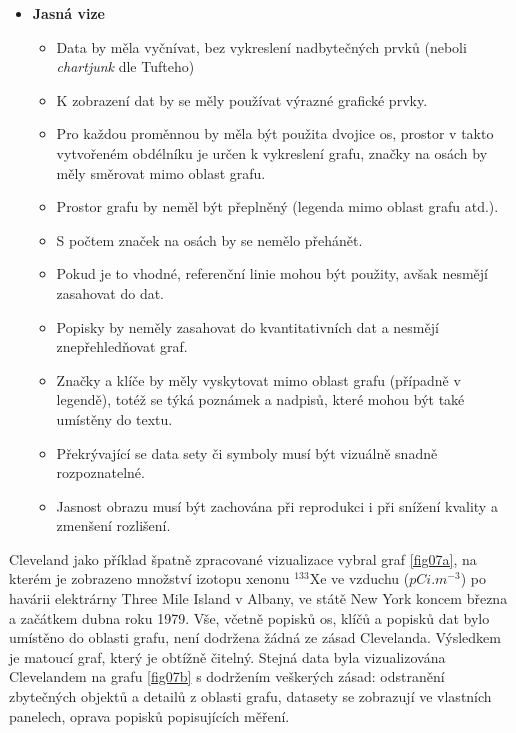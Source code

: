 \documentclass[12pt,]{article}
\providecommand{\tightlist}{%
  \setlength{\itemsep}{0pt}\setlength{\parskip}{0pt}}
\begin{document}
\begin{itemize}
\tightlist
\item
  \textbf{Jasná vize}

  \begin{itemize}
  \tightlist
  \item
    Data by měla vyčnívat, bez vykreslení nadbytečných prvků (neboli
    \emph{chartjunk} dle Tufteho)
  \item
    K zobrazení dat by se měly používat výrazné grafické prvky.
  \item
    Pro každou proměnnou by měla být použita dvojice os, prostor v takto
    vytvořeném obdélníku je určen k vykreslení grafu, značky na osách by
    měly směrovat mimo oblast grafu.
  \item
    Prostor grafu by neměl být přeplněný (legenda mimo oblast grafu
    atd.).
  \item
    S počtem značek na osách by se nemělo přehánět.
  \item
    Pokud je to vhodné, referenční linie mohou být použity, avšak
    nesmějí zasahovat do dat.
  \item
    Popisky by neměly zasahovat do kvantitativních dat a nesmějí
    znepřehledňovat graf.
  \item
    Značky a klíče by měly vyskytovat mimo oblast grafu (případně v
    legendě), totéž se týká poznámek a nadpisů, které mohou být také
    umístěny do textu.
  \item
    Překrývající se data sety či symboly musí být vizuálně snadně
    rozpoznatelné.
  \item
    Jasnost obrazu musí být zachována při reprodukci i při snížení
    kvality a zmenšení rozlišení.
  \end{itemize}
\end{itemize}

Cleveland jako příklad špatně zpracované vizualizace vybral graf
\ref{fig07a}, na kterém je zobrazeno množství izotopu xenonu
\({}^{133}\mbox{Xe}\) ve vzduchu (\(pCi.m^{-3}\)) po havárii elektrárny
Three Mile Island v Albany, ve státě New York koncem března a začátkem
dubna roku 1979. Vše, včetně popisků os, klíčů a popisků dat bylo
umístěno do oblasti grafu, není dodržena žádná ze zásad Clevelanda.
Výsledkem je matoucí graf, který je obtížně čitelný. Stejná data byla
vizualizována Clevelandem na grafu \ref{fig07b} s dodržením veškerých
zásad: odstranění zbytečných objektů a detailů z oblasti grafu, datasety
se zobrazují ve vlastních panelech, oprava popisků popisujících měření.
\end{document}
